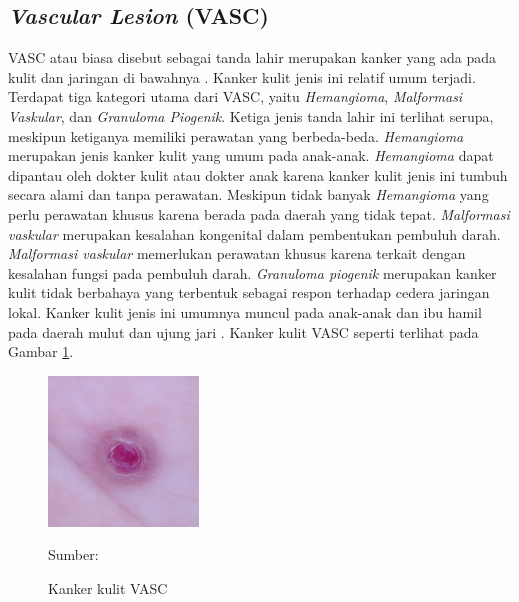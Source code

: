     \subsection{\textit{Vascular Lesion} (VASC)}
    VASC atau biasa disebut sebagai tanda lahir merupakan kanker yang ada pada kulit dan jaringan di bawahnya \citep{Balas2018}. Kanker kulit jenis ini relatif umum terjadi. Terdapat tiga kategori utama dari VASC, yaitu \textit{Hemangioma}, \textit{Malformasi Vaskular}, dan \textit{Granuloma Piogenik}. Ketiga jenis tanda lahir ini terlihat serupa, meskipun ketiganya memiliki perawatan yang berbeda-beda. \textit{Hemangioma} merupakan jenis kanker kulit yang umum pada anak-anak. \textit{Hemangioma} dapat dipantau oleh dokter kulit atau dokter anak karena kanker kulit jenis ini tumbuh secara alami dan tanpa perawatan. Meskipun tidak banyak \textit{Hemangioma} yang perlu perawatan khusus karena berada pada daerah yang tidak tepat. \textit{Malformasi vaskular} merupakan kesalahan kongenital dalam pembentukan pembuluh darah. \textit{Malformasi vaskular} memerlukan perawatan khusus karena terkait dengan kesalahan fungsi pada pembuluh darah. \textit{Granuloma piogenik} merupakan kanker kulit tidak berbahaya yang terbentuk sebagai respon terhadap cedera jaringan lokal. Kanker kulit jenis ini umumnya muncul pada anak-anak dan ibu hamil pada daerah mulut dan ujung jari \citep{Rastogi2020}. Kanker kulit VASC seperti terlihat pada Gambar \ref{fig:vasc}.
    \begin{figure}[H] 
        \begin{center} 
            \includegraphics[width=4cm]{img/bab2/vasc.jpg}
            \caption{Kanker kulit VASC} 
            \label{fig:vasc}
            Sumber: \citep{Codella2018,Combalia2019,Tschandl2018}
        \end{center} 
    \end{figure}

